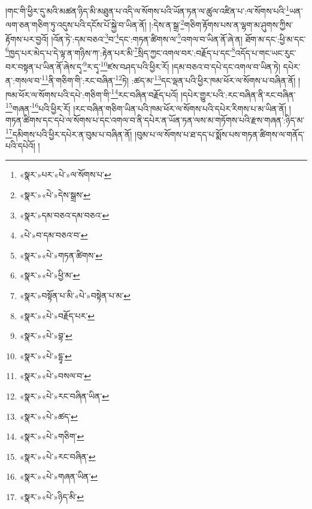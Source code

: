 །གང་གི་ཕྱིར་དུ་མའི་མཚན་ཉིད་མི་མཐུན་པ་འདི་ལ་སོགས་པའི་ཡོན་ཏན་ལ་ཚུལ་འཛིན་པ་:ལ་སོགས་པའི་\footnote{«སྣར་»པར་«པེ་»ལ་སོགས་པ་}ཡན་ལག་ཅན་གཅིག་ཏུ་འདུས་པའི་དངོས་པོ་སྐྱེ་བ་ཡིན་ནོ། །:དེས་ན་སྒྲ་\footnote{«སྣར་»«པེ་»དེས་སྒྲས་}གཅིག་རྟོགས་པས་ན་ལྷག་མ་ཤུགས་ཀྱིས་རྟོགས་པར་བྱའོ། །འོན་ཏེ་:དམ་བཅའ་\footnote{«སྣར་»དམ་བཅའ་དམ་བཅའ་}བ་\footnote{«པེ་»བ་དམ་བཅའ་བ་}དང་:གཏན་ཚིགས་ལ་\footnote{«སྣར་»«པེ་»གཏན་ཚིགས་}འགལ་བ་ཡིན་ནོ་ཞེ་ན། ཐོག་མ་དང་:ཕྱི་མ་དང་\footnote{«སྣར་»«པེ་»ཕྱི་མ་}ཁྱད་པར་མེད་པ་དེ་ལྟ་ན་གཉིས་ཀ་:རྟེན་པར་མི་\footnote{«སྣར་»བསྟོན་པ་མི་«པེ་»བསྟེན་པ་མ་}སྲིད་ཀྱང་འགལ་བར་:བརྗོད་པ་དང་\footnote{«སྣར་»«པེ་»བརྗོད་པར་}འདོད་པ་གང་ཡང་རུང་བར་བསྟན་པ་ཡིན་ནོ་ཞེས་དྭ་\footnote{«སྣར་»«པེ་»བྷ་}ར་དྭ་\footnote{«སྣར་»«པེ་»དྷྭ་}ཛས་བཤད་པའི་ཕྱིར་རོ། །དམ་བཅའ་བ་དཔེ་དང་འགལ་བ་ཡིན་ཏེ། དཔེར་ན་:གསལ་བ་\footnote{«སྣར་»«པེ་»བསལ་བ་}ནི་གཅིག་གི་:རང་བཞིན་\footnote{«སྣར་»«པེ་»རང་བཞིན་ཡིན་}ཏེ། :ཚད་མ་\footnote{«སྣར་»«པེ་»ཚད་}དང་ལྡན་པའི་ཕྱིར་ཁམ་ཕོར་ལ་སོགས་པ་བཞིན་ནོ། །ཁམ་ཕོར་ལ་སོགས་པའི་དཔེ་:གཅིག་གི་\footnote{«སྣར་»«པེ་»གཅིག་}རང་བཞིན་བརྗོད་པའོ། །དཔེར་གྱུར་པའི་:རང་བཞིན་ནི་རང་བཞིན་\footnote{«སྣར་»«པེ་»རང་བཞིན་}གཞན་\footnote{«སྣར་»«པེ་»གཞན་ཡིན་}པའི་ཕྱིར་རོ། །རང་བཞིན་གཅིག་ཡིན་པའི་ཁམ་ཕོར་ལ་སོགས་པའི་དཔེར་རིགས་པ་མ་ཡིན་ནོ། །གཏན་ཚིགས་དང་དཔེ་ལ་སོགས་པ་དང་འགལ་བ་ནི་དཔེར་ན་ཡོན་ཏན་ལས་མ་གཏོགས་པའི་རྫས་གཞན་:ཉིད་མ་\footnote{«སྣར་»«པེ་»ཉིད་མི་}དམིགས་པའི་ཕྱིར་དཔེར་ན་བུམ་པ་བཞིན་ནོ། །བུམ་པ་ལ་སོགས་པ་ཐ་དད་པ་སྨོས་པས་གཏན་ཚིགས་ལ་གནོད་པའི་དཔེའོ། །
